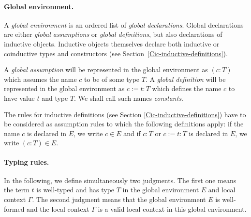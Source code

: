 \paragraph[Global environment.]{Global environment.}

A {\em global environment} is an ordered list of {\em global declarations}.
Global declarations are either {\em global assumptions} or {\em global
definitions}, but also declarations of inductive objects. Inductive objects themselves declare both inductive or coinductive types and constructors
(see Section~\ref{Cic-inductive-definitions}).

A {\em global assumption} will be represented in the global environment as
$(c:T)$ which assumes the name $c$ to be of some type $T$.
A {\em global definition} will
be represented in the global environment as $c:=t:T$ which defines
the name $c$ to have value $t$ and type $T$.
We shall call such names {\em constants}.

The rules for inductive definitions (see Section
\ref{Cic-inductive-definitions}) have to be considered as assumption
rules to which the following definitions apply: if the name $c$ is
declared in $E$, we write $c \in E$ and if $c:T$ or $c:=t:T$ is
declared in $E$, we write $(c : T) \in E$.

\paragraph[Typing rules.]{Typing rules.\label{Typing-rules}}
In the following, we define simultaneously two
judgments.  The first one  means the term $t$ is well-typed
and has type $T$ in the global environment $E$ and local context $\Gamma$.  The
second judgment \WFE{\Gamma} means that the global environment $E$ is
well-formed and the local context $\Gamma$ is a valid local context in this
global environment.
%


